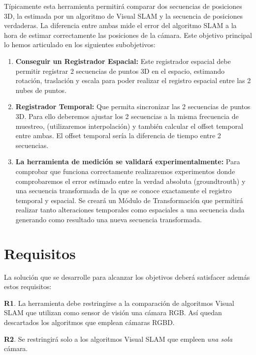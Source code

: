 Típicamente esta herramienta permitirá comparar dos secuencias de posiciones 3D, la estimada por un algoritmo de Visual SLAM y la secuencia de posiciones verdaderas. La diferencia entre ambas mide el error del algoritmo SLAM a la hora de estimar correctamente las posiciones de la cámara.
Este objetivo principal lo hemos articulado en los siguientes subobjetivos:

\begin {enumerate}
\item \textbf{Conseguir un Registrador Espacial:} Este registrador espacial debe permitir registrar 2 secuencias de puntos 3D en el espacio, estimando rotación, traslación y escala para poder realizar el registro espacial entre las 2 nubes de puntos.


\item \textbf{Registrador Temporal:} Que permita sincronizar las 2 secuencias de puntos 3D. Para ello deberemos ajustar los 2 secuencias a la misma frecuencia de muestreo, (utilizaremos interpolación) y también calcular el offset temporal entre ambas. El offset temporal sería la diferencia de tiempo entre 2 secuencias. 

\item \textbf{La herramienta de medición se validará experimentalmente:} Para comprobar que funciona correctamente realizaremos experimentos donde comprobaremos el error estimado entre la verdad absoluta (groundtrouth) y una secuencia transformada de la que se conoce exactamente el registro temporal y espacial. Se creará un Módulo de Transformación que permitirá realizar tanto alteraciones temporales como espaciales a una secuencia dada generando como resultado una nueva secuencia transformada.

\end {enumerate}

\section {Requisitos}

La solución que se desarrolle para alcanzar los objetivos deberá satisfacer además estos requisitos:


	\textbf{R1}. La herramienta debe restringirse a la comparación de algoritmos Visual SLAM que utilizan como sensor de visión una cámara RGB. Así quedan descartados los algoritmos que emplean cámaras RGBD.

	\textbf{R2}. Se restringirá solo a los algoritmos Visual SLAM que empleen \textit{una sola} cámara.


